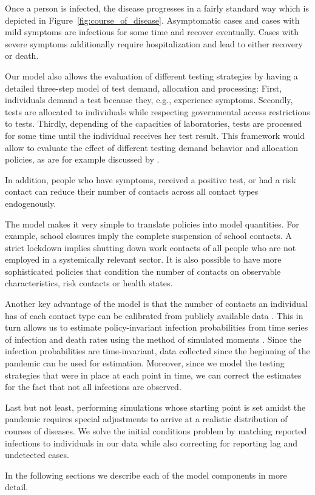 Once a person is infected, the disease progresses in a fairly standard way which is
depicted in Figure~\ref{fig:course_of_disease}. Asymptomatic cases and cases with mild
symptoms are infectious for some time and recover eventually. Cases with severe symptoms
additionally require hospitalization and lead to either recovery or death.

Our model also allows the evaluation of different testing strategies by having a
detailed three-step model of test demand, allocation and processing: First, individuals
demand a test because they, e.g., experience symptoms. Secondly, tests are allocated to
individuals while respecting governmental access restrictions to tests. Thirdly,
depending of the capacities of laboratories, tests are processed for some time until the
individual receives her test result. This framework would allow to evaluate the effect
of different testing demand behavior and allocation policies, as are for example
discussed by \cite{Troeger2020}.

In addition, people who have symptoms, received a positive test, or had a risk contact
can reduce their number of contacts across all contact types endogenously.

The model makes it very simple to translate policies into model quantities. For example,
school closures imply the complete suspension of school contacts. A strict lockdown
implies shutting down work contacts of all people who are not employed in a systemically
relevant sector. It is also possible to have more sophisticated policies that condition
the number of contacts on observable characteristics, risk contacts or health states.

Another key advantage of the model is that the number of contacts an individual has of
each contact type can be calibrated from publicly available data \citep{Mossong2008}.
This in turn allows us to estimate policy-invariant infection probabilities from time
series of infection and death rates using the method of simulated moments
\citep{McFadden1989}. Since the infection probabilities are time-invariant, data
collected since the beginning of the pandemic can be used for estimation. Moreover,
since we model the testing strategies that were in place at each point in time, we can
correct the estimates for the fact that not all infections are observed.

Last but not least, performing simulations whose starting point is set amidst the
pandemic requires special adjustments to arrive at a realistic distribution of courses
of diseases. We solve the initial conditions problem by matching reported infections to
individuals in our data while also correcting for reporting lag and undetected cases.

In the following sections we describe each of the model components in more detail.
